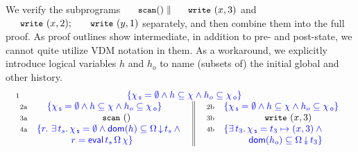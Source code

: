 We verify the subprograms $\esc{scan}() \parallel \esc{write}~(x,3)$
and $\esc{write}~(x,2);\ \esc{write}~(y,1)$ separately, and then
combine them into the full proof. As proof outlines show intermediate,
in addition to pre- and post-state, we cannot quite utilize VDM
notation in them. As a workaround, we explicitly introduce logical
variables $h$ and $h_o$ to name (subsets of) the initial global and
other history.
%
%
{\small
\[
\!\!\!\begin{array}{l l} & \num{1} \hfill
 {\specK{\{ \histS = \hempty \wedge h \subseteq \hist \wedge h_o
                           \subseteq \histO \}}} \hfill \\
& \!\!\!\! \begin{tabular}{l || l}
     \begin{array}[t]{l l}
       \num{2a} &
       \hfil \specK{\{ \histS = \hempty \wedge h \subseteq \hist \wedge h_o \subseteq \histO \}}\hfil\\
       \num{3a} & \multicolumn{1}{c}{\esc{scan}~()} \\
       \num{4a} &
       \specK{\{ r\ldot\, \exists\, t_s\ldot
         \histS = \hempty \wedge  \dom{h} \subseteq \ideal{\stableorder}{t_s} \wedge \hbox{}}\\
       &
       \specK{\phantom{\{r\ldot\, \exists\, t_s\ldot}\,
         r = \eval\, t_s\, \stableorder\, \hist\}}
     \end{array}~&~
     \!\!\!\begin{array}[t]{r l}
       \num{2b} &
       \specK{\{ \histS = \hempty \wedge h \subseteq \hist \wedge h_o \subseteq \histO \}} \\       
       \num{3b} & \multicolumn{1}{c}{\esc{write}~(x,3)}\\
       \num{4b} &
       \specK{\{ \exists\, t_3\ldot
         \histS = t_3 \hpts (x,3) \wedge \hbox{}}\\
       & \specK{\phantom{\{\exists\, t_3\ldot}\,
         \dom{h_o} \subseteq \sideal{\stableorder}{t_3}\}}
     \end{array}
   \end{tabular}\\

\end{array}\]}
